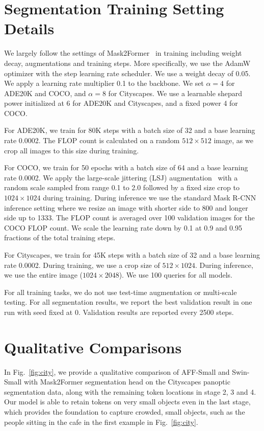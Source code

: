 \documentclass[10pt,twocolumn,letterpaper]{article}
\begin{document}
\section{Segmentation Training Setting Details}\label{sec:setting}
We largely follow the settings of Mask2Former~\cite{mask2} in training including weight decay, augmentations and training steps. 
More specifically, we use the AdamW~\cite{adamw} optimizer with the step learning rate scheduler. We use a weight decay of 0.05. We apply a learning rate multiplier 0.1 to the backbone. We set $\alpha=4$ for ADE20K and COCO, and $\alpha=8$ for Cityscapes. We use a learnable shepard power initialized at 6 for ADE20K and Cityscapes, and a fixed power 4 for COCO.

For ADE20K, we train for 80K steps with a batch size of 32 and a base learning rate 0.0002. The FLOP count is calculated on a random $512\times 512$ image, as we crop all images to this size during training.

For COCO, we train for 50 epochs with a batch size of 64 and a base learning rate 0.0002. We apply the large-scale jittering (LSJ) augmentation~\cite{du2021simple, simplycopy} with a random scale sampled from range 0.1 to 2.0 followed by a fixed size crop to $1024\times 1024$ during training. During inference we use the standard Mask R-CNN~\cite{maskrcnn} inference setting where we resize an image with shorter side to 800 and longer side up to 1333. The FLOP count is averaged over 100 validation images for the COCO FLOP count. We scale the learning rate down by 0.1 at 0.9 and 0.95 fractions of the total training steps.

For Cityscapes, we train for 45K steps with a batch size of 32 and a base learning rate 0.0002. During training, we use a crop size of $512 \times 1024$. During inference, we use the entire image ($1024 \times 2048$). We use 100 queries for all models.


For all training tasks, we do not use test-time augmentation or multi-scale testing. For all segmentation results, we report the best validation result in one run with seed fixed at 0. Validation results are reported every 2500 steps.

\section{Qualitative Comparisons}

In Fig.~\ref{fig:city}, we provide a qualitative comparison of AFF-Small and Swin-Small with Mask2Former segmentation head on the Cityscapes panoptic segmentation data, along with the remaining token locations in stage 2, 3 and 4. Our model is able to retain tokens on very small objects even in the last stage, which provides the foundation to capture crowded, small objects, such as the people sitting in the cafe in the first example in Fig.~\ref{fig:city}.
\end{document}
